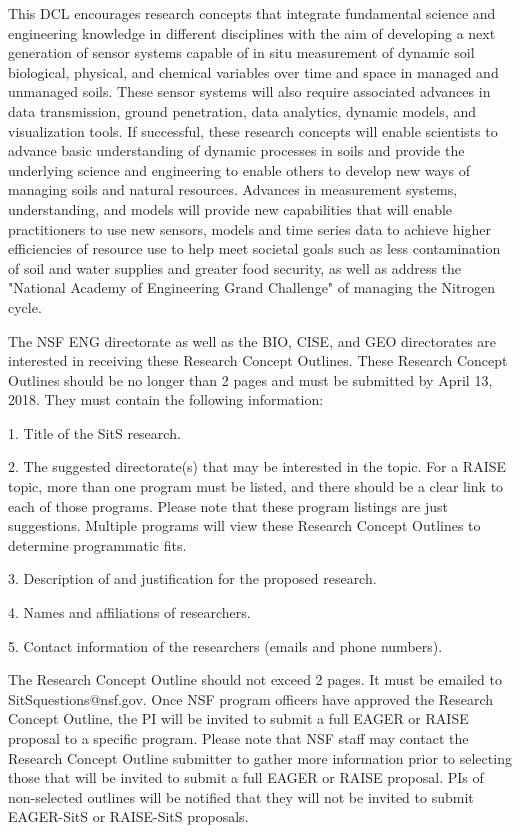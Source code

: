 \documentclass[11pt,letterpaper]{article}
\begin{document}
This DCL encourages research concepts that integrate fundamental science and engineering knowledge in different disciplines with the aim of developing a next generation of sensor systems capable of in situ measurement of dynamic soil biological, physical, and chemical variables over time and space in managed and unmanaged soils. These sensor systems will also require associated advances in data transmission, ground penetration, data analytics, dynamic models, and visualization tools. If successful, these research concepts will enable scientists to advance basic understanding of dynamic processes in soils and provide the underlying science and engineering to enable others to develop new ways of managing soils and natural resources. Advances in measurement systems, understanding, and models will provide new capabilities that will enable practitioners to use new sensors, models and time series data to achieve higher efficiencies of resource use to help meet societal goals such as less contamination of soil and water supplies and greater food security, as well as address the "National Academy of Engineering
Grand Challenge" of managing the Nitrogen cycle.

The NSF ENG directorate as well as the BIO, CISE, and GEO directorates are interested in receiving these Research Concept Outlines. These Research Concept Outlines should be no longer than 2 pages and must be submitted by April 13, 2018. They must contain the following
information:

1. Title of the SitS research.

2. The suggested directorate(s) that may be interested in the topic. For a RAISE topic, more than one program must be listed, and there should be a clear link to each of those programs. Please note that these program listings are just suggestions. Multiple programs will view these Research Concept Outlines to determine programmatic fits.

3. Description of and justification for the proposed research.

4. Names and affiliations of researchers.

5. Contact information of the researchers (emails and phone numbers).

The Research Concept Outline should not exceed 2 pages. It must be emailed to
SitSquestions@nsf.gov. Once NSF program officers have approved the Research Concept Outline, the PI will be invited to submit a full EAGER or RAISE proposal to a specific program. Please note that NSF staff may contact the Research Concept Outline submitter to gather more information prior to selecting those that will be invited to submit a full EAGER or RAISE proposal. PIs of non-selected outlines will be notified that they will not be invited to submit EAGER-SitS or RAISE-SitS proposals.
\end{document}
